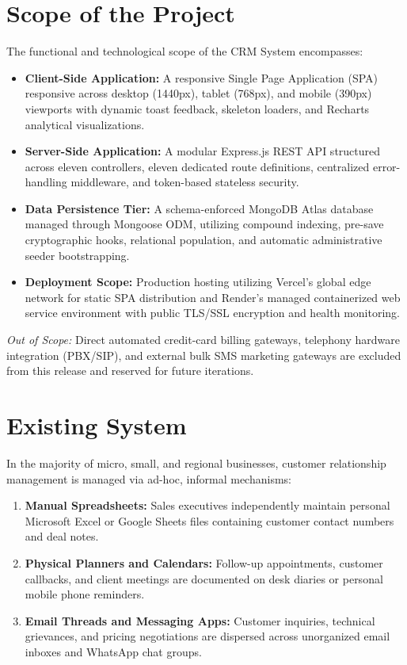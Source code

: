 \section{Scope of the Project}
The functional and technological scope of the CRM System encompasses:
\begin{itemize}
    \item \textbf{Client-Side Application:} A responsive Single Page Application (SPA) responsive across desktop (1440px), tablet (768px), and mobile (390px) viewports with dynamic toast feedback, skeleton loaders, and Recharts analytical visualizations.
    \item \textbf{Server-Side Application:} A modular Express.js REST API structured across eleven controllers, eleven dedicated route definitions, centralized error-handling middleware, and token-based stateless security.
    \item \textbf{Data Persistence Tier:} A schema-enforced MongoDB Atlas database managed through Mongoose ODM, utilizing compound indexing, pre-save cryptographic hooks, relational population, and automatic administrative seeder bootstrapping.
    \item \textbf{Deployment Scope:} Production hosting utilizing Vercel's global edge network for static SPA distribution and Render's managed containerized web service environment with public TLS/SSL encryption and health monitoring.
\end{itemize}
\noindent \textit{Out of Scope:} Direct automated credit-card billing gateways, telephony hardware integration (PBX/SIP), and external bulk SMS marketing gateways are excluded from this release and reserved for future iterations.

\section{Existing System}
In the majority of micro, small, and regional businesses, customer relationship management is managed via ad-hoc, informal mechanisms:
\begin{enumerate}
    \item \textbf{Manual Spreadsheets:} Sales executives independently maintain personal Microsoft Excel or Google Sheets files containing customer contact numbers and deal notes.
    \item \textbf{Physical Planners and Calendars:} Follow-up appointments, customer callbacks, and client meetings are documented on desk diaries or personal mobile phone reminders.
    \item \textbf{Email Threads and Messaging Apps:} Customer inquiries, technical grievances, and pricing negotiations are dispersed across unorganized email inboxes and WhatsApp chat groups.
\end{enumerate}

